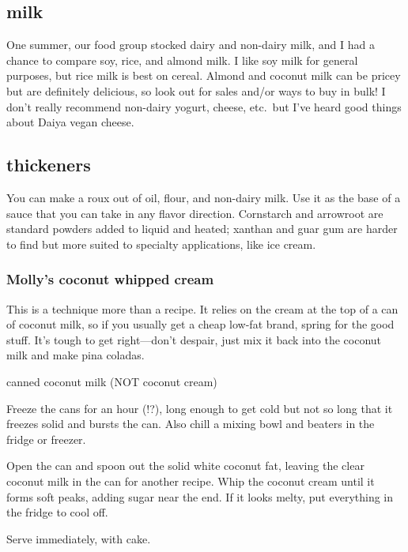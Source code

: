 \subsection{milk}
One summer, our food group stocked dairy and non-dairy milk, and I had a chance to compare soy, rice, and almond milk. I like soy milk for general purposes, but rice milk is best on cereal. Almond and coconut milk can be pricey but are definitely delicious, so look out for sales and/or ways to buy in bulk! I don't really recommend non-dairy yogurt, cheese, etc.\ but I've heard good things about Daiya vegan cheese.

\subsection{thickeners}
You can make a roux out of oil, flour, and non-dairy milk. Use it as the base of a sauce that you can take in any flavor direction. Cornstarch and arrowroot are standard powders added to liquid and heated; xanthan and guar gum are harder to find but more suited to specialty applications, like ice cream.


\subsubsection{Molly's coconut whipped cream}
This is a technique more than a recipe. It relies on the cream at the top of a can of coconut milk, so if you usually get a cheap low-fat brand, spring for the good stuff. It's tough to get right---don't despair, just mix it back into the coconut milk and make pina coladas.

canned coconut milk (NOT coconut cream)

Freeze the cans for an hour (!?), long enough to get cold but not so long that it freezes solid and bursts the can. Also chill a mixing bowl and beaters in the fridge or freezer.

Open the can and spoon out the solid white coconut fat, leaving the clear coconut milk in the can for another recipe. Whip the coconut cream until it forms soft peaks, adding sugar near the end. If it looks melty, put everything in the fridge to cool off.

Serve immediately, with cake.


